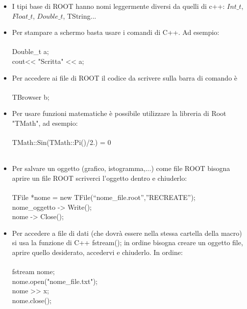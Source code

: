 \documentclass[10pt,a4paper]{article}
\begin{document}
\begin{itemize}
\item I tipi base di ROOT hanno nomi leggermente diversi da quelli di c++: \(Int\_t\), \(Float\_t\), \(Double\_t\), TString...\\
\item Per stampare a schermo basta usare i comandi di C++. Ad esempio:\\\\
Double\_t a;\\
cout<< "Scritta" << a;\\
\item Per accedere ai file di ROOT il codice da scrivere sulla barra di comando è\\\\
TBrowser b;\\
\item Per usare funzioni matematiche è possibile utilizzare la libreria di Root "TMath", ad esempio:\\\\
TMath::Sin(TMath::Pi()/2.) = 0\\\\ 
\item Per salvare un oggetto (grafico, istogramma,...) come file ROOT bisogna aprire un file ROOT scriverci l'oggetto dentro e chiuderlo:\\\\
TFile *nome = new TFile(“nome\_file.root”,”RECREATE”);\\
nome\_oggetto -> Write();\\
nome -> Close();\\
\item Per accedere a file di dati (che dovrà essere nella stessa cartella della macro) si usa la funzione di C++ fstream(); in ordine bisogna creare un oggetto file, aprire quello desiderato, accedervi e chiuderlo. In ordine:\\\\
 fstream nome;\\
 nome.open("nome\_file.txt");\\
 nome >> x;\\
 nome.close();\\\\
\end{itemize}
\end{document}
